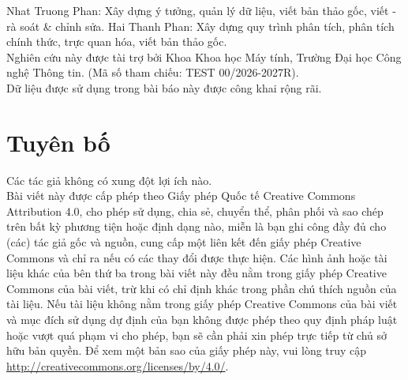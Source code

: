 \vspace{18pt}

 Nhat Truong Phan: Xây dựng ý tưởng, quản lý dữ liệu, viết bản thảo gốc, viết - rà soát \& chỉnh sửa. Hai Thanh Phan: Xây dựng quy trình phân tích, phân tích chính thức, trực quan hóa, viết bản thảo gốc.\\

 Nghiên cứu này được tài trợ bởi Khoa Khoa học Máy tính, Trường Đại học Công nghệ Thông tin. (Mã số tham chiếu: TEST 00/2026-2027R).\\

 Dữ liệu được sử dụng trong bài báo này được công khai rộng rãi.

\section{Tuyên bố}

 Các tác giả không có xung đột lợi ích nào.\\

 Bài viết này được cấp phép theo Giấy phép Quốc tế Creative Commons Attribution 4.0, cho phép sử dụng, chia sẻ, chuyển thể, phân phối và sao chép trên bất kỳ phương tiện hoặc định dạng nào, miễn là bạn ghi công đầy đủ cho (các) tác giả gốc và nguồn, cung cấp một liên kết đến giấy phép Creative Commons và chỉ ra nếu có các thay đổi được thực hiện. Các hình ảnh hoặc tài liệu khác của bên thứ ba trong bài viết này đều nằm trong giấy phép Creative Commons của bài viết, trừ khi có chỉ định khác trong phần chú thích nguồn của tài liệu. Nếu tài liệu không nằm trong giấy phép Creative Commons của bài viết và mục đích sử dụng dự định của bạn không được phép theo quy định pháp luật hoặc vượt quá phạm vi cho phép, bạn sẽ cần phải xin phép trực tiếp từ chủ sở hữu bản quyền. Để xem một bản sao của giấy phép này, vui lòng truy cập \url{http://creativecommons.org/licenses/by/4.0/}.
